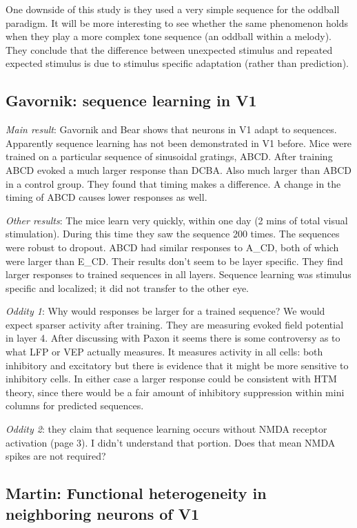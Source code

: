 \documentclass{article} %
\begin{document}
One downside of this study is they used a very simple sequence for the oddball
paradigm. It will be more interesting to see whether the same phenomenon holds
when they play a more complex tone sequence (an oddball within a melody). They
conclude that the difference between unexpected stimulus and repeated expected
stimulus is due to stimulus specific adaptation (rather than prediction).

\subsection{Gavornik: sequence learning in V1}

\emph{Main result}: Gavornik and Bear \cite{Gavornik2014} shows that neurons in
V1 adapt to sequences. Apparently sequence learning has not been demonstrated in
V1 before. Mice were trained on a particular sequence of sinusoidal gratings,
ABCD.  After training ABCD evoked a much larger response than DCBA. Also much
larger than ABCD in a control group.  They found that timing makes a difference.
A change in the timing of ABCD causes lower responses as well.

\emph{Other results}: The mice learn very quickly, within one day (2 mins of
total
visual stimulation). During this time they saw the sequence 200 times.  The
sequences were robust to dropout. ABCD had similar responses to A\_CD, both of
which were larger than E\_CD.  Their results don't seem to be layer specific.
They find larger responses to trained sequences in all layers.   Sequence
learning was stimulus specific and localized; it did not transfer to the other
eye.

\emph{Oddity 1}: Why would responses be larger for a trained sequence? We would
expect
sparser activity after training. They are measuring evoked field potential in
layer 4. After discussing with Paxon it seems there is some controversy as to
what LFP or VEP actually measures. It measures activity in all cells: both
inhibitory and excitatory but there is evidence that it might be more sensitive
to inhibitory cells.  In either case a larger response could be consistent with
HTM theory, since there would be a fair amount of inhibitory suppression within
mini columns for predicted sequences.

\emph{Oddity 2}: they claim that sequence learning occurs without NMDA receptor
activation (page 3). I didn't understand that portion. Does that mean NMDA
spikes are not required?

\subsection{Martin: Functional heterogeneity in neighboring neurons of V1}
 
\end{document}
